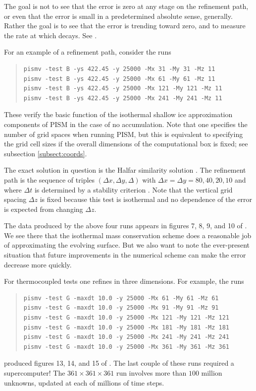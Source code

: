 \documentclass[11pt,final]{amsart}
\begin{document}
The goal is not to see that the error is zero at any stage on the refinement path, or even that the error is small in a predetermined absolute sense, generally.  Rather the goal is to see that the error is trending toward zero, and to measure the rate at which decays.  See \cite{BLKCB,BBL,Roache,Wesseling}.

For an example of a refinement path, consider the runs
\begin{quote}\small\begin{verbatim}
pismv -test B -ys 422.45 -y 25000 -Mx 31 -My 31 -Mz 11
pismv -test B -ys 422.45 -y 25000 -Mx 61 -My 61 -Mz 11
pismv -test B -ys 422.45 -y 25000 -Mx 121 -My 121 -Mz 11
pismv -test B -ys 422.45 -y 25000 -Mx 241 -My 241 -Mz 11
\end{verbatim}
\normalsize\end{quote}
These verify the basic function of the isothermal shallow ice approximation components of PISM in the case of no accumulation.  Note that one specifies the number of grid spaces when running PISM, but this is equivalent to specifying the grid cell sizes if the overall dimensions of the computational box is fixed; see subsection \ref{subsect:coords}.

The exact solution in question is the Halfar similarity solution \cite{Halfar83}.  The refinement path is the sequence of triples $(\Delta x,\Delta y,\Delta)$ with $\Delta x = \Delta y = 80,40,20,10$ and where $\Delta t$ is determined by a stability criterion \cite{BBL}.  Note that the vertical grid spacing $\Delta z$ is fixed because this test is isothermal and no dependence of the error is expected from changing $\Delta z$.

The data produced by the above four runs appears in figures 7, 8, 9, and 10 of \cite{BLKCB}.  We see there that the isothermal mass conservation scheme does a reasonable job of approximating the evolving surface.  But we also want to note the ever-present situation that future improvements in the numerical scheme can make the error decrease more quickly.

For thermocoupled tests one refines in three dimensions.  For example, the runs
\begin{quote}\small\begin{verbatim}
pismv -test G -maxdt 10.0 -y 25000 -Mx 61 -My 61 -Mz 61
pismv -test G -maxdt 10.0 -y 25000 -Mx 91 -My 91 -Mz 91
pismv -test G -maxdt 10.0 -y 25000 -Mx 121 -My 121 -Mz 121
pismv -test G -maxdt 10.0 -y 25000 -Mx 181 -My 181 -Mz 181
pismv -test G -maxdt 10.0 -y 25000 -Mx 241 -My 241 -Mz 241
pismv -test G -maxdt 10.0 -y 25000 -Mx 361 -My 361 -Mz 361
\end{verbatim}
\normalsize\end{quote}
produced figures 13, 14, and 15 of \cite{BBL}.  The last couple of these runs required a supercomputer!  The $361\times 361\times 361$ run involves more than $100$ million unknowns, updated at each of millions of time steps.
\end{document}

